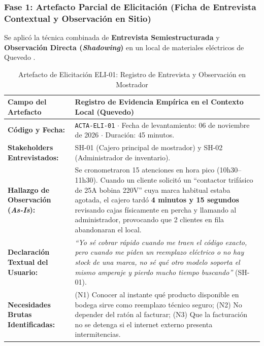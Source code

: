 \documentclass[conference,10pt]{IEEEtran}
\begin{document}
	\subsubsection{Fase 1: Artefacto Parcial de Elicitación (Ficha de Entrevista Contextual y Observación en Sitio)}
	Se aplicó la técnica combinada de \textbf{Entrevista Semiestructurada} y \textbf{Observación Directa (\textit{Shadowing})} en un local de materiales eléctricos de Quevedo \cite{pohl2025, wiegers2013}.
	\begin{table}[htbp]
		\centering
		\scriptsize
		\caption{Artefacto de Elicitación ELI-01: Registro de Entrevista y Observación en Mostrador}
		\label{tab:artefacto_elicitacion}
		\begin{tabularx}{\textwidth}{>{\raggedright\arraybackslash}p{} Y}
			\toprule
			\textbf{Campo del Artefacto} & \textbf{Registro de Evidencia Empírica en el Contexto Local (Quevedo)} \\
			\midrule
			\textbf{Código y Fecha:} & \texttt{ACTA-ELI-01} $\cdot$ Fecha de levantamiento: 06 de noviembre de 2026 $\cdot$ Duración: 45 minutos. \\
			\textbf{Stakeholders Entrevistados:} & SH-01 (Cajero principal de mostrador) y SH-02 (Administrador de inventario). \\
			\textbf{Hallazgo de Observación (\textit{As-Is}):} & Se cronometraron 15 atenciones en hora pico (10h30--11h30). Cuando un cliente solicitó un ``contactor trifásico de 25A bobina 220V'' cuya marca habitual estaba agotada, el cajero tardó \textbf{4 minutos y 15 segundos} revisando cajas físicamente en percha y llamando al administrador, provocando que 2 clientes en fila abandonaran el local. \\
			\textbf{Declaración Textual del Usuario:} & \textit{``Yo sé cobrar rápido cuando me traen el código exacto, pero cuando me piden un reemplazo eléctrico o no hay stock de una marca, no sé qué otro modelo soporta el mismo amperaje y pierdo mucho tiempo buscando''} (SH-01). \\
			\textbf{Necesidades Brutas Identificadas:} & (N1) Conocer al instante qué producto disponible en bodega sirve como reemplazo técnico seguro; (N2) No depender del ratón al facturar; (N3) Que la facturación no se detenga si el internet externo presenta intermitencias. \\
			\bottomrule
		\end{tabularx}
	\end{table}
\end{document}
